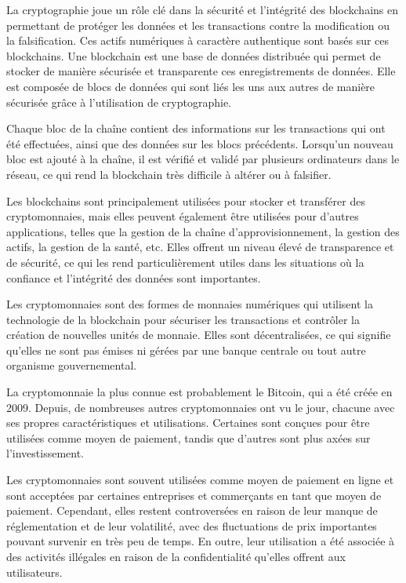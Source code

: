 La cryptographie joue un rôle clé dans la sécurité et l'intégrité des blockchains en permettant de protéger les données et les transactions contre la modification ou la falsification.
Ces actifs numériques à caractère authentique sont basés sur ces blockchains. Une blockchain est une base de données distribuée qui permet de stocker de manière sécurisée et transparente ces enregistrements de données. Elle est composée de blocs de données qui sont liés les uns aux autres de manière sécurisée grâce à l'utilisation de cryptographie.

Chaque bloc de la chaîne contient des informations sur les transactions qui ont été effectuées, ainsi que des données sur les blocs précédents. Lorsqu'un nouveau bloc est ajouté à la chaîne, il est vérifié et validé par plusieurs ordinateurs dans le réseau, ce qui rend la blockchain très difficile à altérer ou à falsifier.

Les blockchains sont principalement utilisées pour stocker et transférer des cryptomonnaies, mais elles peuvent également être utilisées pour d'autres applications, telles que la gestion de la chaîne d'approvisionnement, la gestion des actifs, la gestion de la santé, etc. Elles offrent un niveau élevé de transparence et de sécurité, ce qui les rend particulièrement utiles dans les situations où la confiance et l'intégrité des données sont importantes.

Les cryptomonnaies sont des formes de monnaies numériques qui utilisent la technologie de la blockchain pour sécuriser les transactions et contrôler la création de nouvelles unités de monnaie. Elles sont décentralisées, ce qui signifie qu'elles ne sont pas émises ni gérées par une banque centrale ou tout autre organisme gouvernemental.

La cryptomonnaie la plus connue est probablement le Bitcoin, qui a été créée en 2009. Depuis, de nombreuses autres cryptomonnaies ont vu le jour, chacune avec ses propres caractéristiques et utilisations. Certaines sont conçues pour être utilisées comme moyen de paiement, tandis que d'autres sont plus axées sur l'investissement.

Les cryptomonnaies sont souvent utilisées comme moyen de paiement en ligne et sont acceptées par certaines entreprises et commerçants en tant que moyen de paiement. Cependant, elles restent controversées en raison de leur manque de réglementation et de leur volatilité, avec des fluctuations de prix importantes pouvant survenir en très peu de temps. En outre, leur utilisation a été associée à des activités illégales en raison de la confidentialité qu'elles offrent aux utilisateurs.

